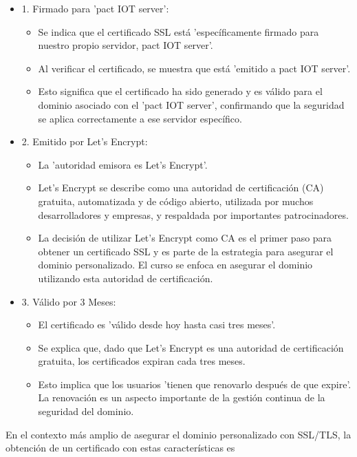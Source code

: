 \documentclass{report}
\begin{document}
\begin{itemize}
    \item 1. Firmado para 'pact IOT server':
        \begin{itemize}
            \item Se indica que el certificado SSL está 'específicamente firmado para nuestro propio servidor, pact IOT server'.
            \item Al verificar el certificado, se muestra que está 'emitido a pact IOT server'.
            \item Esto significa que el certificado ha sido generado y es válido para el dominio asociado con el 'pact IOT server', 
            confirmando que la seguridad se aplica correctamente a ese servidor específico.
        \end{itemize}
    \item 2. Emitido por Let's Encrypt:
        \begin{itemize}
            \item La 'autoridad emisora es Let's Encrypt'.
            \item Let's Encrypt se describe como una autoridad de certificación (CA) gratuita, automatizada y de código abierto, 
            utilizada por muchos desarrolladores y empresas, y respaldada por importantes patrocinadores.
            \item La decisión de utilizar Let's Encrypt como CA es el primer paso para obtener un certificado SSL y es parte de la 
            estrategia para asegurar el dominio personalizado. El curso se enfoca en asegurar el dominio utilizando esta autoridad 
            de certificación.
        \end{itemize}
    \item 3. Válido por 3 Meses:
        \begin{itemize}
            \item El certificado es 'válido desde hoy hasta casi tres meses'.
            \item Se explica que, dado que Let's Encrypt es una autoridad de certificación gratuita, los certificados expiran 
            cada tres meses.
            \item Esto implica que los usuarios 'tienen que renovarlo después de que expire'. La renovación es un aspecto importante 
            de la gestión continua de la seguridad del dominio.
        \end{itemize}
\end{itemize}
En el contexto más amplio de asegurar el dominio personalizado con SSL/TLS, la obtención de un certificado con estas características es 
\end{document}
